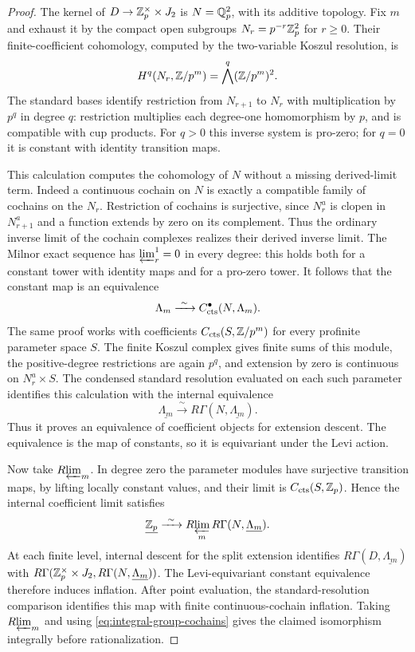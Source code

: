 \begin{proof}
The kernel of $D\to\mathbb Z_p^\times\times J_2$ is
$N=\mathbb Q_p^2$, with its additive topology.
Fix $m$ and exhaust it by the compact open subgroups
$N_r=p^{-r}\mathbb Z_p^2$ for $r\geq0$.  Their finite-coefficient
cohomology, computed by the two-variable Koszul resolution, is
\[
 H^q(N_r,\mathbb Z/p^m)=\bigwedge^q(\mathbb Z/p^m)^2.
\]
The standard bases identify restriction from $N_{r+1}$ to $N_r$
with multiplication by $p^q$ in degree $q$: restriction multiplies
each degree-one homomorphism by $p$, and is compatible with cup
products.  For $q>0$ this inverse system is pro-zero; for $q=0$
it is constant with identity transition maps.

This calculation computes the cohomology of $N$ without a missing
derived-limit term.  Indeed a continuous cochain on $N$ is exactly
a compatible family of cochains on the $N_r$.
Restriction of cochains is surjective, since $N_r^a$ is clopen in
$N_{r+1}^a$ and a function extends by zero on its complement.
Thus the ordinary inverse limit of the cochain complexes realizes
their derived inverse limit.  The Milnor exact sequence has
$\varprojlim^1_r=0$ in every degree: this holds both for a constant
tower with identity maps and for a pro-zero tower.  It follows that
the constant map is an equivalence
\[
 \Lambda_m\xrightarrow{\ \sim\ }C_{\cts}^{\bullet}(N,\Lambda_m).
\]
The same proof works with coefficients
$C_{\mathrm{cts}}(S,\mathbb Z/p^m)$ for every profinite parameter space $S$.
The finite Koszul complex gives finite sums of this module, the
positive-degree restrictions are again $p^q$, and extension by
zero is continuous on $N_r^a\times S$.
The condensed standard resolution evaluated on each such parameter
identifies this calculation with the internal equivalence
\[
 \underline{\Lambda_m}\xrightarrow{\ \sim\ }
       R\Gamma(N,\underline{\Lambda_m}).
\]
Thus it proves an equivalence of coefficient objects for extension
descent.  The equivalence is the map of constants, so it is equivariant
under the Levi action.

Now take $R\!\varprojlim_m$.  In degree zero the parameter modules have
surjective transition maps, by lifting locally constant values,
and their limit is $C_{\mathrm{cts}}(S,\mathbb Z_p)$.
Hence the internal coefficient limit satisfies
\[
 \underline{\mathbb Z_p}\xrightarrow{\ \sim\ }
       R\!\varprojlim_m R\Gamma(N,\underline{\Lambda_m}).
\]
At each finite level, internal descent for the split extension identifies
$R\Gamma(D,\underline{\Lambda_m})$ with
$R\Gamma(\mathbb Z_p^\times\times J_2,
R\Gamma(N,\underline{\Lambda_m}))$.
The Levi-equivariant constant equivalence therefore induces inflation.
After point evaluation, the standard-resolution comparison identifies
this map with finite continuous-cochain inflation.  Taking $R\!\varprojlim_m$
and using \eqref{eq:integral-group-cochains} gives the claimed
isomorphism integrally before rationalization.


\end{proof}
